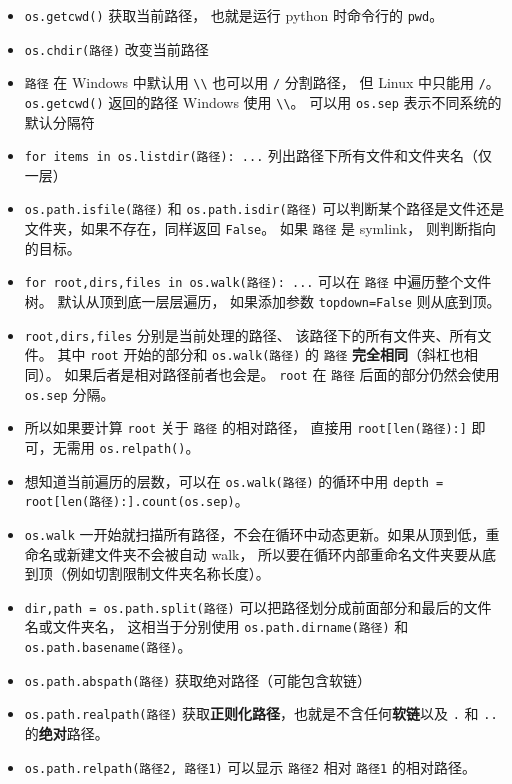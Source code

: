 
\begin{itemize}
\item \verb`os.getcwd()` 获取当前路径， 也就是运行 python 时命令行的 \verb`pwd`。
\item \verb`os.chdir(路径)` 改变当前路径 
\item \verb`路径` 在 Windows 中默认用 \verb`\\` 也可以用 \verb`/` 分割路径， 但 Linux 中只能用 \verb`/`。 \verb`os.getcwd()` 返回的路径 Windows 使用 \verb`\\`。 可以用 \verb`os.sep` 表示不同系统的默认分隔符
\item \verb`for items in os.listdir(路径): ...` 列出路径下所有文件和文件夹名（仅一层）
\item \verb`os.path.isfile(路径)` 和 \verb`os.path.isdir(路径)` 可以判断某个路径是文件还是文件夹，如果不存在，同样返回 \verb`False`。 如果 \verb`路径` 是 symlink， 则判断指向的目标。
\item \verb`for root,dirs,files in os.walk(路径): ...` 可以在 \verb`路径` 中遍历整个文件树。 默认从顶到底一层层遍历， 如果添加参数 \verb`topdown=False` 则从底到顶。
\item \verb`root,dirs,files` 分别是当前处理的路径、 该路径下的所有文件夹、所有文件。 其中 \verb`root` 开始的部分和 \verb`os.walk(路径)` 的 \verb`路径` \textbf{完全相同}（斜杠也相同）。 如果后者是相对路径前者也会是。 \verb`root` 在 \verb`路径` 后面的部分仍然会使用 \verb`os.sep` 分隔。
\item 所以如果要计算 \verb`root` 关于 \verb`路径` 的相对路径， 直接用 \verb`root[len(路径):]` 即可，无需用 \verb`os.relpath()`。
\item 想知道当前遍历的层数，可以在 \verb`os.walk(路径)` 的循环中用 \verb`depth = root[len(路径):].count(os.sep)`。
\item \verb`os.walk` 一开始就扫描所有路径，不会在循环中动态更新。如果从顶到低，重命名或新建文件夹不会被自动 walk， 所以要在循环内部重命名文件夹要从底到顶（例如切割限制文件夹名称长度）。
\item \verb`dir,path = os.path.split(路径)` 可以把路径划分成前面部分和最后的文件名或文件夹名， 这相当于分别使用 \verb`os.path.dirname(路径)` 和 \verb`os.path.basename(路径)`。
\item \verb`os.path.abspath(路径)` 获取绝对路径（可能包含软链）
\item \verb`os.path.realpath(路径)` 获取\textbf{正则化路径}，也就是不含任何\textbf{软链}以及 \verb`.` 和 \verb`..` 的\textbf{绝对}路径。
\item \verb`os.path.relpath(路径2, 路径1)` 可以显示 \verb`路径2` 相对 \verb`路径1` 的相对路径。

\end{itemize}
